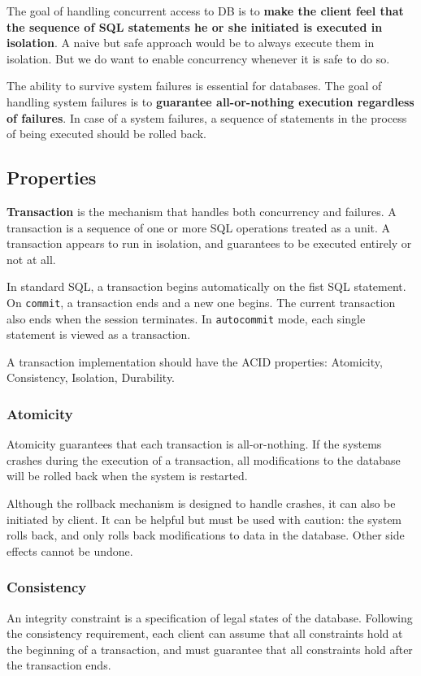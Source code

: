 The goal of handling concurrent access to DB is to \textbf{make the client feel that the sequence of SQL statements he or she initiated is executed in isolation}. A naive but safe approach would be to always execute them in isolation. But we do want to enable concurrency whenever it is safe to do so. 

The ability to survive system failures is essential for databases. The goal of handling system failures is to \textbf{guarantee all-or-nothing execution regardless of failures}. In case of a system failures, a sequence of statements in the process of being executed should be rolled back. 
\subsection{Properties}
\textbf{Transaction} is the mechanism that handles both concurrency and failures. A transaction is a sequence of one or more SQL operations treated as a unit. A transaction appears to run in isolation, and guarantees to be executed entirely or not at all. 

In standard SQL, a transaction begins automatically on the fist SQL statement. On \texttt{commit}, a transaction ends and a new one begins. The current transaction also ends when the session terminates. In \texttt{autocommit} mode, each single statement is viewed as a transaction.

A transaction implementation should have the ACID properties: Atomicity, Consistency, Isolation, Durability.
\subsubsection{Atomicity}
Atomicity guarantees that each transaction is all-or-nothing. If the systems crashes during the execution of a transaction, all modifications to the database will be rolled back when the system is restarted. 

Although the rollback mechanism is designed to handle crashes, it can also be initiated by client. It can be helpful but must be used with caution: the system rolls back, and only rolls back modifications to data in the database. Other side effects cannot be undone. 
\subsubsection{Consistency}
An integrity constraint is a specification of legal states of the database. Following the consistency requirement, each client can assume that all constraints hold at the beginning of a transaction, and must guarantee that all constraints hold after the transaction ends. 
